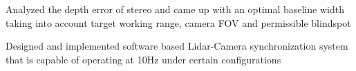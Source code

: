 \documentclass[]{deedy-resume-openfont}
\begin{document}
\begin{minipage}[t]{0.69\textwidth}
\begin{tightemize}
\item Analyzed the depth error of stereo and came up with an optimal baseline width taking into account target working range, camera FOV and permissible blindspot
\item Designed and implemented software based Lidar-Camera synchronization system that is capable of operating at 10Hz under certain configurations
\end{tightemize}
\sectionsep



\end{minipage}
\end{document}
